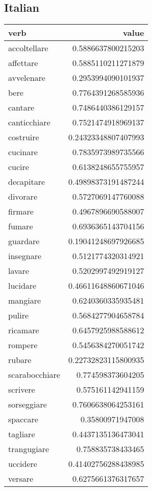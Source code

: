 \subsection{Italian}

\begin{longtable}{l|r}
\textbf{verb}     & \textbf{value}    \\
\hline
\endhead
accoltellare   & 0.5886637800215203  \\
affettare      & 0.5885110211271879  \\
avvelenare     & 0.2953994090101937  \\
bere           & 0.7764391268585936  \\
cantare        & 0.7486440386129157  \\
canticchiare   & 0.7521474918969137  \\
costruire      & 0.24323348807407993 \\
cucinare       & 0.7835973989735566  \\
cucire         & 0.6138248655755957  \\
decapitare     & 0.49898373191487244 \\
divorare       & 0.5727069147760088  \\
firmare        & 0.4967896690588007  \\
fumare         & 0.6936365143704156  \\
guardare       & 0.19041248697926685 \\
insegnare      & 0.5121774320314921  \\
lavare         & 0.5202997492919127  \\
lucidare       & 0.46611648860671046 \\
mangiare       & 0.6240360335935481  \\
pulire         & 0.5684277904658784  \\
ricamare       & 0.6457925988588612  \\
rompere        & 0.5456384270051742  \\
rubare         & 0.22732823115800935 \\
scarabocchiare & 0.774598373604205   \\
scrivere       & 0.575161142941159   \\
sorseggiare    & 0.7606638064253161  \\
spaccare       & 0.35800971947008    \\
tagliare       & 0.4437135136473041  \\
trangugiare    & 0.758835738433465   \\
uccidere       & 0.41402756288438985 \\
versare        & 0.6275661376317657 
\end{longtable}



